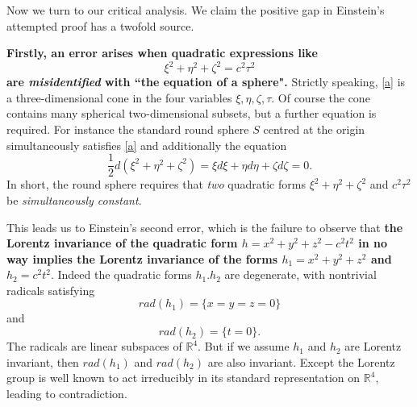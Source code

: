 \documentclass[12pt]{amsart}
\theoremstyle{definition}
\theoremstyle{remark}
\newcommand{\bR}{\mathbb{R}}
\newcommand{\del}{\partial}
\begin{document}
Now we turn to our critical analysis. We claim the positive gap in Einstein's attempted proof has a twofold source. 

\textbf{Firstly, an error arises when quadratic expressions like \begin{equation}\label{a}\xi^2+\eta^2+\zeta^2=c^2 \tau^2
\end{equation} are \emph{misidentified} with ``the equation of a sphere".} Strictly speaking, \eqref{a} is a three-dimensional cone in the four variables $\xi, \eta, \zeta, \tau$. Of course the cone contains many spherical two-dimensional subsets, but a further equation is required. For instance the standard round sphere $S$ centred at the origin simultaneously satisfies \eqref{a} and additionally the equation $$\frac{1}{2}d(\xi^2+\eta^2+\zeta^2)=\xi d\xi+\eta d\eta +\zeta d\zeta=0.$$ In short, the round sphere requires that \emph{two} quadratic forms $\xi^2+\eta^2+\zeta^2$ and $c^2\tau^2$ be \emph{simultaneously constant}. 

This leads us to Einstein's second error, which is the failure to observe that \textbf{the Lorentz invariance of the quadratic form $h=x^2+y^2+z^2-c^2t^2$ in no way implies the Lorentz invariance of the forms $h_1=x^2+y^2+z^2$ and $h_2=c^2 t^2.$ } Indeed the quadratic forms $h_1. h_2$ are degenerate, with nontrivial radicals satisfying $$rad(h_1)=\{x=y=z=0\}$$ and $$rad(h_2)=\{t=0\}.$$ The radicals are linear subspaces of $\bR^4$. But if we assume $h_1$ and $h_2$ are Lorentz invariant, then $rad(h_1)$ and $rad(h_2)$ are also invariant. Except the Lorentz group is well known to act irreducibly in its standard representation on $\bR^4$, leading to contradiction.





\end{document}
